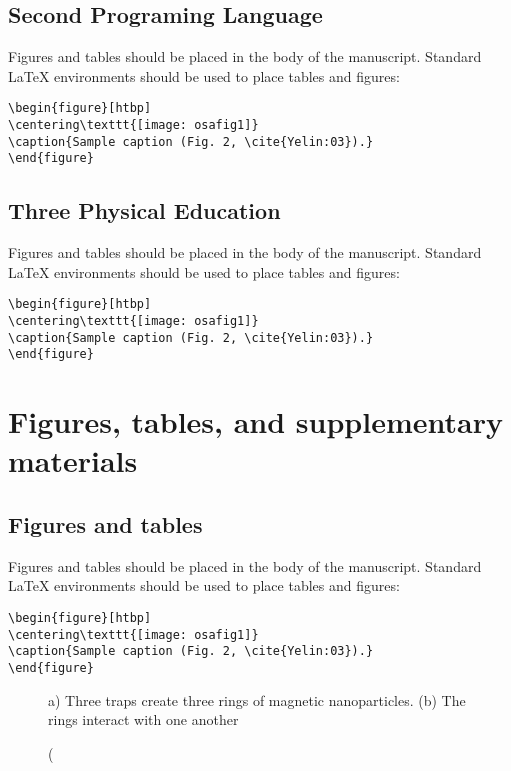 \documentclass[twocolumn]{article}
\begin{document}
\subsection{Second Programing Language}
Figures and tables should be placed in the body of the manuscript. Standard \LaTeX{} environments should be used to place tables and figures:
\begin{verbatim}
\begin{figure}[htbp]
\centering\texttt{[image: osafig1]}
\caption{Sample caption (Fig. 2, \cite{Yelin:03}).}
\end{figure}
\end{verbatim}

\subsection{Three Physical Education}
Figures and tables should be placed in the body of the manuscript. Standard \LaTeX{} environments should be used to place tables and figures:
\begin{verbatim}
\begin{figure}[htbp]
\centering\texttt{[image: osafig1]}
\caption{Sample caption (Fig. 2, \cite{Yelin:03}).}
\end{figure}
\end{verbatim}

\section{Figures, tables, and supplementary materials}

\subsection{Figures and tables}
Figures and tables should be placed in the body of the manuscript. Standard \LaTeX{} environments should be used to place tables and figures:
\begin{verbatim}
\begin{figure}[htbp]
\centering\texttt{[image: osafig1]}
\caption{Sample caption (Fig. 2, \cite{Yelin:03}).}
\end{figure}
\end{verbatim}

\begin{figure}[ht!]
    \caption(a) Three traps create three rings of magnetic nanoparticles. (b) The rings interact with one another 
\end{figure}
\end{document}
